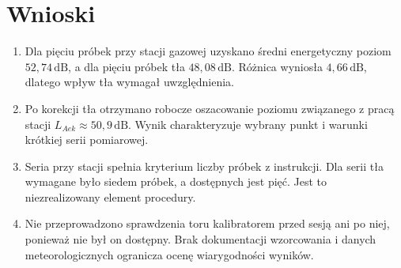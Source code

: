 \clearpage
\section{Wnioski}
\label{sec:wnioski}
\begin{enumerate}
 \item Dla pięciu próbek przy stacji gazowej uzyskano średni
 energetyczny poziom $52{,}74\,\mathrm{dB}$, a dla pięciu próbek
 tła $48{,}08\,\mathrm{dB}$. Różnica wyniosła $4{,}66\,\mathrm{dB}$,
 dlatego wpływ tła wymagał uwzględnienia.
 \item Po korekcji tła otrzymano robocze oszacowanie poziomu
 związanego z pracą stacji $L_{Aek}\approx50{,}9\,\mathrm{dB}$.
 Wynik charakteryzuje wybrany punkt i warunki krótkiej serii
 pomiarowej.
 \item Seria przy stacji spełnia kryterium liczby próbek z instrukcji.
 Dla serii tła wymagane było siedem próbek, a dostępnych jest pięć.
 Jest to niezrealizowany element procedury.
 \item Nie przeprowadzono sprawdzenia toru kalibratorem przed
 sesją ani po niej, ponieważ nie był on dostępny. Brak dokumentacji
 wzorcowania i danych meteorologicznych ogranicza ocenę
 wiarygodności wyników.
\end{enumerate}
